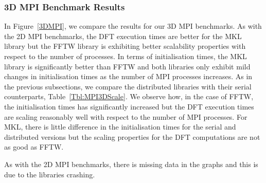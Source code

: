 \documentclass[12pt, a4paper]{article} \setlength{\textheight}{24cm}
\begin{document}
\subsubsection{3D MPI Benchmark Results}
In Figure~\ref{3DMPI}, we compare the results for our 3D MPI
benchmarks. As with the 2D MPI benchmarks, the DFT execution times are
better for the MKL library but the FFTW library is exhibiting better
scalability properties with respect to the number of processes. In
terms of initialisation times, the MKL library is significantly better
than FFTW and both libraries only exhibit mild changes in
initialisation times as the number of MPI processes increases. As in
the previous subsections, we compare the distributed libraries with
their serial counterparts, Table~\ref{Tbl:MPI3DScale}. We observe how,
in the case of FFTW, the initialisation times has significantly
increased but the DFT execution times are scaling reasonably well with
respect to the number of MPI processes. For MKL, there is little
difference in the initialisation times for the serial and distributed
versions but the scaling properties for the DFT computations are not
as good as FFTW.

As with the 2D MPI benchmarks, there is missing data in the graphs and
this is due to the libraries crashing.
\end{document}

